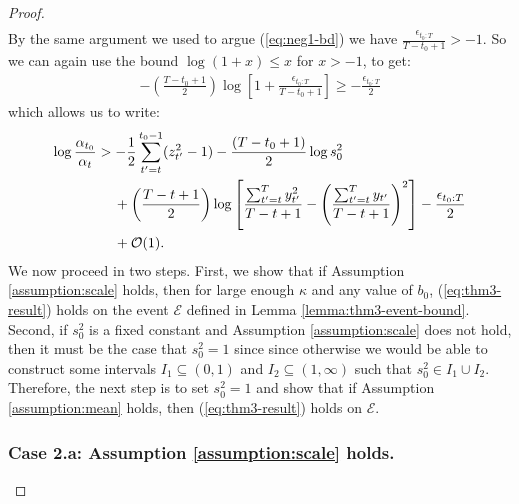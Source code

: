 \begin{proof}
\begin{align}
\end{align}
By the same argument we used to argue (\ref{eq:neg1-bd}) we have $\frac{\epsilon_{t_0:T}}{T-t_0+1} > -1$. So we can again use the bound $\log(1+x) \leq x$ for $x > -1$, to get: 
\begin{align*}
    -\left(\frac{T - t_0 +1}{2}\right)\log \left[1 + \frac{\epsilon_{t_0:T}}{T-t_0+1}\right] \geq -  \frac{\epsilon_{t_0:T}}{2}
\end{align*}
which allows us to write:
\begin{align}
    \log \frac{\alpha_{t_0}}{\alpha_t} &> - \frac{1}{2} \sum_{t' = t}^{t_0 - 1} (z_{t'}^2-1) - \frac{(T-t_0+1)}{2}\log s_0^2 \notag \\
    &\quad\: + \left(\frac{T - t +1}{2}\right)\log\left[\frac{\sum_{t'=t}^T y_{t'}^2}{T-t+1} - \left(\frac{\sum_{t'=t}^T y_{t'}}{T-t+1}\right)^2 \right] - \frac{\epsilon_{t_0:T}}{2} \notag \\
    &\quad\: + \mathcal{O}(1). \label{eq:thm3-cs2-bd1}
\end{align}
We now proceed in two steps. First, we show that if Assumption \ref{assumption:scale} holds, then for large enough $\kappa$ and any value of $b_0$, (\ref{eq:thm3-result}) holds on the event $\mathcal{E}$ defined in Lemma \ref{lemma:thm3-event-bound}. Second, if $s_0^2$ is a fixed constant and Assumption \ref{assumption:scale} does not hold, then it must be the case that $s_0^2 = 1$ since since otherwise we would be able to construct some intervals $I_1\subseteq(0,1)$ and $I_2 \subseteq(1,\infty)$ such that $s_0^2 \in I_1\cup I_2$. Therefore, the next step is to set $s_0^2 = 1$ and show that if Assumption \ref{assumption:mean} holds, then (\ref{eq:thm3-result}) holds on $\mathcal{E}$.

\subsubsection*{Case 2.a: Assumption \ref{assumption:scale} holds.}


\end{proof}
